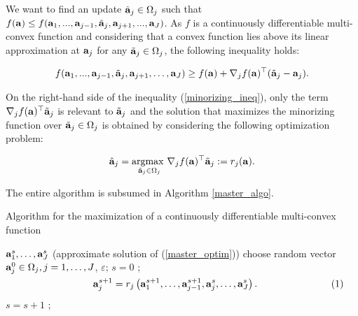 \documentclass[
]{jss}
\begin{document}
We want to find an update \(\hat{\mathbf{a}}_j\in \Omega_j\) such that
\(f(\mathbf{a})\leq f(\mathbf{a}_1, ..., \mathbf{a}_{j-1}, \hat{\mathbf{a}}_j, \mathbf{a}_{j+1}, ..., \mathbf{a}_J)\).
As \(f\) is a continuously differentiable multi-convex function and
considering that a convex function lies above its linear approximation
at \(\mathbf{a}_j\) for any \(\tilde{\mathbf{a}}_j\in\Omega_j\), the following
inequality holds:

\begin{equation}
\begin{gathered}
f(\mathbf{a}_1, ..., \mathbf{a}_{j-1}, \tilde{\mathbf{a}}_j, \mathbf{a}_{j+1}, \ldots, \mathbf{a}_J) \geq f(\mathbf{a}) + \nabla_jf(\mathbf{a})^\top(\tilde{\mathbf{a}}_j - \mathbf{a}_j).
\label{minorizing_ineq}
\end{gathered}
\end{equation}

On the right-hand side of the inequality (\ref{minorizing_ineq}), only
the term \(\nabla_jf(\mathbf{a})^\top\tilde{\mathbf{a}}_j\) is relevant to
\(\tilde{\mathbf{a}}_j\) and the solution that maximizes the minorizing
function over \(\tilde{\mathbf{a}}_j\in\Omega_j\) is obtained by considering
the following optimization problem:

\begin{equation}
\hat{\mathbf{a}}_j = \underset{\tilde{\mathbf{a}}_j\in\Omega_j}{\mathrm{argmax~}} \nabla_j f(\mathbf{a})^\top \tilde{\mathbf{a}}_j := r_j(\mathbf{a}).
\label{core_update}
\end{equation}

The entire algorithm is subsumed in Algorithm \ref{master_algo}.

\begin{algorithm}[!ht]
    \caption{Algorithm for the maximization of a continuously differentiable multi-convex function}
    \begin{algorithmic}[1]
         {$\mathbf{a}_1^s, \ldots, \mathbf{a}_J^s$ (approximate solution of (\ref{master_optim}))}
         {choose random vector $\mathbf{a}_j^0\in\Omega_j, j =1, \ldots, J$, $\varepsilon$;}
        \STATE$s = 0$ ;
        \REPEAT
        \STATE \hspace{-2cm}$\vcenter{\begin{equation}
            \ma a_j^{s+1} = r_j\left( \ma a_1^{s+1}, \ldots, \ma a_{j-1}^{s+1}, \ma a_j^{s}, \ldots, \ma a_J^{s}\right).
        \end{equation}}$
        \ENDFOR
        \STATE$s = s + 1$ ;
    \end{algorithmic}
    \label{master_algo}
\end{algorithm}
\end{document}
